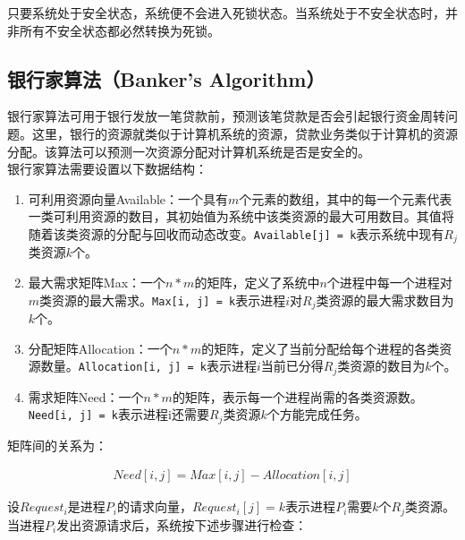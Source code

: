 只要系统处于安全状态，系统便不会进入死锁状态。当系统处于不安全状态时，并非所有不安全状态都必然转换为死锁。

\subsection{银行家算法（Banker's Algorithm）}

银行家算法可用于银行发放一笔贷款前，预测该笔贷款是否会引起银行资金周转问题。这里，银行的资源就类似于计算机系统的资源，贷款业务类似于计算机的资源分配。该算法可以预测一次资源分配对计算机系统是否是安全的。 \\

银行家算法需要设置以下数据结构：

\begin{enumerate}
	\item 可利用资源向量Available：一个具有$ m $个元素的数组，其中的每一个元素代表一类可利用资源的数目，其初始值为系统中该类资源的最大可用数目。其值将随着该类资源的分配与回收而动态改变。\lstinline|Available[j] = k|表示系统中现有$ R_j $类资源$ k $个。

	\item 最大需求矩阵Max：一个$ n * m $的矩阵，定义了系统中$ n $个进程中每一个进程对$ m $类资源的最大需求。\lstinline|Max[i, j] = k|表示进程$ i $对$ R_j $类资源的最大需求数目为$ k $个。

	\item 分配矩阵Allocation：一个$ n * m $的矩阵，定义了当前分配给每个进程的各类资源数量。\lstinline|Allocation[i, j] = k|表示进程$ i $当前已分得$ R_j $类资源的数目为$ k $个。

	\item 需求矩阵Need：一个$ n * m $的矩阵，表示每一个进程尚需的各类资源数。\lstinline|Need[i, j] = k|表示进程i还需要$ R_j $类资源$ k $个方能完成任务。
\end{enumerate}

矩阵间的关系为：

\vspace{-1cm}
\begin{align}\nonumber
	Need[i, j] = Max[i, j] - Allocation[i, j]
\end{align}

设$ Request_i $是进程$ P_i $的请求向量，$ Request_i[j] = k $表示进程$ P_i $需要$ k $个$ R_j $类资源。当进程$ P_i $发出资源请求后，系统按下述步骤进行检查：

